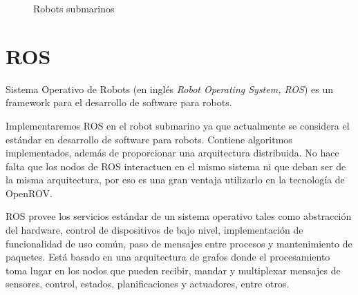 \begin{figure}[hbtp]
  \begin{center}
  \end{center}
  \caption{Robots submarinos}
  \label{fig:submarino}
\end{figure}
  
\section{ROS}
\label{cap:ROS}

Sistema Operativo de Robots (en inglés \textit{Robot Operating System, ROS}\cite{ros}) es un framework para el desarrollo de software para robots. 

Implementaremos ROS en el robot submarino ya que actualmente se considera el estándar en desarrollo de software para robots. Contiene algoritmos implementados, además de proporcionar una arquitectura distribuida. No hace falta que los nodos de ROS interactuen en el mismo sistema ni que deban ser de la misma arquitectura, por eso es una gran ventaja utilizarlo en la tecnología de OpenROV. 

ROS provee los servicios estándar de un sistema operativo tales como abstracción del hardware, control de dispositivos de bajo nivel, implementación de funcionalidad de uso común, paso de mensajes entre procesos y mantenimiento de paquetes. Está basado en una arquitectura de grafos donde el procesamiento toma lugar en los nodos que pueden recibir, mandar y multiplexar mensajes de sensores, control, estados, planificaciones y actuadores, entre otros.


